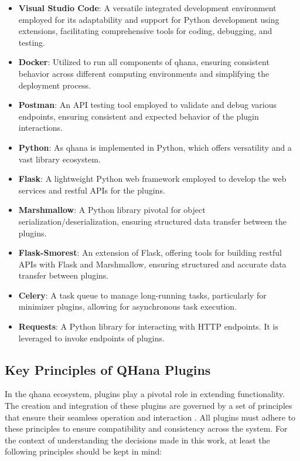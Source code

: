\documentclass[
  a4paper,  %
  twoside,  %
  bibliography=totoc,
  headsepline,
  cleardoublepage=empty,
  parskip=half,
  draft=false
]{scrbook}
\begin{document}
\begin{itemize}
    \item \textbf{Visual Studio Code}: A versatile integrated development environment employed for its adaptability and support for Python development using extensions, facilitating comprehensive tools for coding, debugging, and testing.

    \item \textbf{Docker}: Utilized to run all components of \gls{qhana}, ensuring consistent behavior across different computing environments and simplifying the deployment process.

    \item \textbf{Postman}: An API testing tool employed to validate and debug various endpoints, ensuring consistent and expected behavior of the plugin interactions.

    \item \textbf{Python}: As \gls{qhana} is implemented in Python, which offers versatility and a vast library ecosystem.

    \item \textbf{Flask}: A lightweight Python web framework employed to develop the web services and \gls{rest}ful APIs for the plugins.

    \item \textbf{Marshmallow}: A Python library pivotal for object serialization/deserialization, ensuring structured data transfer between the plugins.

    \item \textbf{Flask-Smorest}: An extension of Flask, offering tools for building \gls{rest}ful APIs with Flask and Marshmallow, ensuring structured and accurate data transfer between plugins.

    \item \textbf{Celery}: A task queue to manage long-running tasks, particularly for minimizer plugins, allowing for asynchronous task execution.

    \item \textbf{Requests}: A Python library for interacting with HTTP endpoints. It is leveraged to invoke endpoints of plugins.
\end{itemize}

\subsection{Key Principles of QHana Plugins}

In the \gls{qhana} ecosystem, plugins play a pivotal role in extending functionality.
The creation and integration of these plugins are governed by a set of principles that ensure their seamless operation and interaction \cite{FabianBuehler}.
All plugins must adhere to these principles to ensure compatibility and consistency across the system.
For the context of understanding the decisions made in this work, at least the following principles should be kept in mind:
\end{document}
